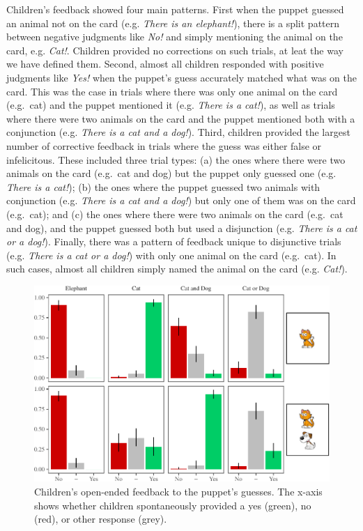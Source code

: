 \documentclass[floatsintext,man]{apa6}
\theoremstyle{definition}
\theoremstyle{definition}
\theoremstyle{definition}
\theoremstyle{remark}
\begin{document}
Children's feedback showed four main patterns. First when the puppet
guessed an animal not on the card (e.g. \emph{There is an elephant!}),
there is a split pattern between negative judgments like \emph{No!} and
simply mentioning the animal on the card, e.g. \emph{Cat!}. Children
provided no corrections on such trials, at leat the way we have defined
them. Second, almost all children responded with positive judgments like
\emph{Yes!} when the puppet's guess accurately matched what was on the
card. This was the case in trials where there was only one animal on the
card (e.g.~cat) and the puppet mentioned it (e.g. \emph{There is a
cat!}), as well as trials where there were two animals on the card and
the puppet mentioned both with a conjunction (e.g. \emph{There is a cat
and a dog!}). Third, children provided the largest number of corrective
feedback in trials where the guess was either false or infelicitous.
These included three trial types: (a) the ones where there were two
animals on the card (e.g.~cat and dog) but the puppet only guessed one
(e.g. \emph{There is a cat!}); (b) the ones where the puppet guessed two
animals with conjunction (e.g. \emph{There is a cat and a dog!}) but
only one of them was on the card (e.g.~cat); and (c) the ones where
there were two animals on the card (e.g.~cat and dog), and the puppet
guessed both but used a disjunction (e.g. \emph{There is a cat or a
dog!}). Finally, there was a pattern of feedback unique to disjunctive
trials (e.g. \emph{There is a cat or a dog!}) with only one animal on
the card (e.g.~cat). In such cases, almost all children simply named the
animal on the card (e.g. \emph{Cat!}).

\begin{figure}
\centering
\includegraphics{figs/study3JudgmentPlot-1.pdf}
\caption{\label{fig:study3JudgmentPlot}Children's open-ended feedback to the
puppet's guesses. The x-axis shows whether children spontaneously
provided a yes (green), no (red), or other response (grey).}
\end{figure}
\end{document}
